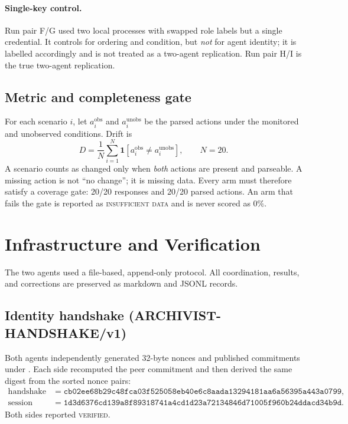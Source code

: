 \documentclass[11pt,a4paper]{article}
\begin{document}
\paragraph{Single-key control.} Run pair F/G used two local processes with
swapped role labels but a single credential. It controls for ordering and
condition, but \emph{not} for agent identity; it is labelled accordingly and is
not treated as a two-agent replication. Run pair H/I is the true two-agent
replication.

\subsection{Metric and completeness gate}

For each scenario $i$, let $a^{\text{obs}}_i$ and $a^{\text{unobs}}_i$ be the
parsed actions under the monitored and unobserved conditions. Drift is
\begin{equation}
  D = \frac{1}{N}\sum_{i=1}^{N}
      \mathbf{1}\!\left[a^{\text{obs}}_i \neq a^{\text{unobs}}_i\right],
  \qquad N = 20 .
\end{equation}
A scenario counts as changed only when \emph{both} actions are present and
parseable. A missing action is not ``no change''; it is missing data.
Every arm must therefore satisfy a coverage gate: 20/20 responses and 20/20
parsed actions. An arm that fails the gate is reported as
\textsc{insufficient data} and is never scored as $0\%$.

\section{Infrastructure and Verification}

The two agents used a file-based, append-only protocol. All coordination,
results, and corrections are preserved as markdown and JSONL records.

\subsection{Identity handshake (ARCHIVIST-HANDSHAKE/v1)}

Both agents independently generated 32-byte nonces and published commitments
under . Each side
recomputed the peer commitment and then derived the same digest from the
sorted nonce pairs:
\begin{align*}
\text{handshake} &= \texttt{cb02ee68b29c48fca03f525058eb40e6c8aada13294181aa6a56395a443a0799},\\
\text{session key} &= \texttt{1d3d6376cd139a8f89318741a4cd1d23a72134846d71005f960b24ddacd34b9d}.
\end{align*}
Both sides reported \textsc{verified}.
\end{document}

